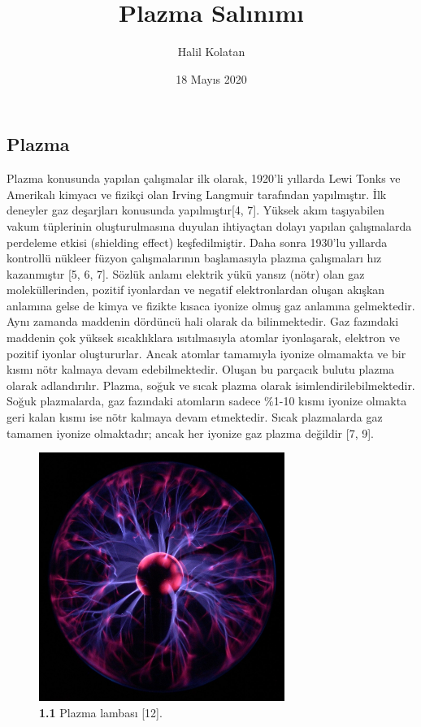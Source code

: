 \documentclass[a4paper,11pt]{article}
\title{\textbf{{\Huge Plazma Salınımı}}}
\author{{{\huge Halil Kolatan}}}
\affil{{\large Ankara Üniversitesi,\\ Fen Fakültesi,\\ Fizik Bölümü}}
\date{{\Large 18 Mayıs 2020}}
\begin{document}
	\maketitle
	
	\tableofcontents
	
	\newpage
	
	\begin{center}
	\section{Plazma}
	\end{center}



Plazma konusunda yapılan çalışmalar ilk olarak, 1920’li yıllarda Lewi Tonks ve Amerikalı kimyacı ve fizikçi olan Irving Langmuir tarafından yapılmıştır. İlk deneyler gaz deşarjları konusunda yapılmıştır[4, 7]. Yüksek akım taşıyabilen vakum tüplerinin oluşturulmasına
duyulan ihtiyaçtan dolayı yapılan çalışmalarda perdeleme etkisi (shielding effect) keşfedilmiştir. Daha sonra 1930’lu yıllarda kontrollü
nükleer füzyon çalışmalarının başlamasıyla plazma çalışmaları hız kazanmıştır [5, 6, 7]. Sözlük anlamı  elektrik yükü yansız (nötr) olan gaz moleküllerinden, pozitif iyonlardan ve negatif elektronlardan oluşan akışkan anlamına gelse de kimya ve fizikte kısaca iyonize olmuş gaz anlamına gelmektedir. Aynı zamanda maddenin dördüncü hali olarak da bilinmektedir. Gaz fazındaki maddenin çok yüksek sıcaklıklara ısıtılmasıyla atomlar iyonlaşarak, elektron ve pozitif iyonlar oluştururlar. Ancak atomlar tamamıyla iyonize olmamakta ve bir kısmı nötr kalmaya devam edebilmektedir. Oluşan bu parçacık bulutu
plazma olarak adlandırılır. Plazma, soğuk ve
sıcak plazma olarak isimlendirilebilmektedir. Soğuk plazmalarda, gaz fazındaki
atomların sadece \%1-10 kısmı iyonize olmakta geri kalan kısmı ise nötr kalmaya devam
etmektedir. Sıcak plazmalarda gaz tamamen iyonize olmaktadır;
ancak her iyonize gaz plazma değildir [7, 9].

\begin{figure}[h]
	\centering
	\includegraphics[width=8cm,keepaspectratio=true]{img/lamb.jpg}
	\caption* {\textbf{1.1} Plazma lambası [12].}
\end{figure}
\end{document}
